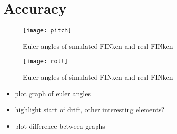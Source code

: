 

\section{Accuracy}
\begin{figure}
\begin{center}
\texttt{[image: pitch]}
\caption{Euler angles of simulated FINken and real FINken}
\label{pic:pitchResponse}
\end{center}
\end{figure}
\begin{figure}
\begin{center}
\texttt{[image: roll]}
\caption{Euler angles of simulated FINken and real FINken}
\label{pic:rollResponse}
\end{center}
\end{figure}
\begin{itemize}
\item{plot graph of euler angles}
\item{highlight start of drift, other interesting elements?}
\item{plot difference between graphs}
\end{itemize}

